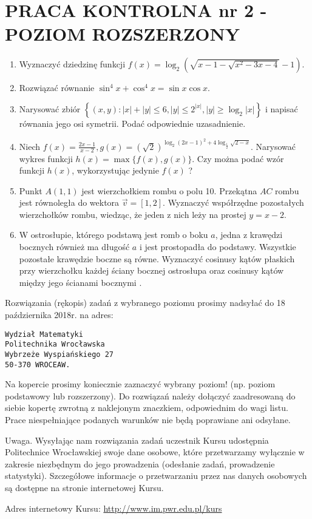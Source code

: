\documentclass[10pt]{article}
\begin{document}
\section*{PRACA KONTROLNA nr 2 - POZIOM ROZSZERZONY}
\begin{enumerate}
  \item Wyznaczyć dziedzinę funkcji $f(x)=\log _{2}\left(\sqrt{x-1-\sqrt{x^{2}-3 x-4}}-1\right)$.
  \item Rozwiązać równanie $\sin ^{4} x+\cos ^{4} x=\sin x \cos x$.
  \item Narysować zbiór $\left\{(x, y):|x|+|y| \leqslant 6,|y| \leqslant 2^{|x|},|y| \geqslant \log _{2}|x|\right\}$ i napisać równania jego osi symetrii. Podać odpowiednie uzasadnienie.
  \item Niech $f(x)=\frac{2 x-1}{x-2}, g(x)=(\sqrt{2})^{\log _{2}(2 x-1)^{2}+4 \log _{\frac{1}{2}} \sqrt{2-x}}$. Narysować wykres funkcji $h(x)=\max \{f(x), g(x)\}$. Czy można podać wzór funkcji $h(x)$, wykorzystując jedynie $f(x)$ ?
  \item Punkt $A(1,1)$ jest wierzchołkiem rombu o polu 10. Przekątna $A C$ rombu jest równoległa do wektora $\vec{v}=[1,2]$. Wyznaczyć współrzędne pozostałych wierzchołków rombu, wiedząc, że jeden z nich leży na prostej $y=x-2$.
  \item W ostrosłupie, którego podstawą jest romb o boku $a$, jedna z krawędzi bocznych również ma długość $a$ i jest prostopadła do podstawy. Wszystkie pozostałe krawędzie boczne są równe. Wyznaczyć cosinusy kątów płaskich przy wierzchołku każdej ściany bocznej ostrosłupa oraz cosinusy kątów między jego ścianami bocznymi .
\end{enumerate}

Rozwiązania (rękopis) zadań z wybranego poziomu prosimy nadsyłać do 18 października 2018r. na adres:

\begin{verbatim}
Wydział Matematyki
Politechnika Wrocławska
Wybrzeże Wyspiańskiego 27
50-370 WROCEAW.
\end{verbatim}

Na kopercie prosimy koniecznie zaznaczyć wybrany poziom! (np. poziom podstawowy lub rozszerzony). Do rozwiązań należy dołączyć zaadresowaną do siebie kopertę zwrotną z naklejonym znaczkiem, odpowiednim do wagi listu. Prace niespełniające podanych warunków nie będą poprawiane ani odsyłane.

Uwaga. Wysyłając nam rozwiązania zadań uczestnik Kursu udostępnia Politechnice Wrocławskiej swoje dane osobowe, które przetwarzamy wyłącznie w zakresie niezbędnym do jego prowadzenia (odesłanie zadań, prowadzenie statystyki). Szczegółowe informacje o przetwarzaniu przez nas danych osobowych są dostępne na stronie internetowej Kursu.

Adres internetowy Kursu: \href{http://www.im.pwr.edu.pl/kurs}{http://www.im.pwr.edu.pl/kurs}
\end{document}
